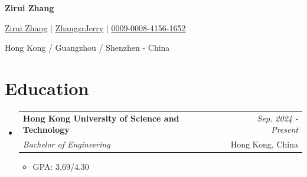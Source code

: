 \documentclass[a4paper,11pt]{article}
\makeatletter
\newcommand{\resumeSubheading}[4]{
\vspace{0.5mm}\item
    \begin{tabular*}{0.98\textwidth}[t]{l@{\extracolsep{\fill}}r}
        \textbf{#1} & \textit{\footnotesize{#4}} \\
        \textit{\footnotesize{#3}} &  \footnotesize{#2}\\
    \end{tabular*}
    \vspace{-2.4mm}
}
\newcommand{\resumeSubHeadingListStart}{\begin{itemize}[leftmargin=*,labelsep=1mm]}
\newcommand{\resumeItemListStart}{\begin{itemize}[leftmargin=*,labelsep=1mm,itemsep=0.5mm]}
\newcommand{\resumeSubHeadingListEnd}{\end{itemize}\vspace{2mm}}
\newcommand{\resumeItemListEnd}{\end{itemize}\vspace{-2mm}}
\newcommand{\socialicon}[1]{\raisebox{-0.05em}{\resizebox{!}{1em}{#1}}}
\newcommand{\headerfontiii}{\fontfamily{ppl}\selectfont} %
\makeatother
\begin{document}
\headerfontiii

\begin{center}
    {\Huge\textbf{Zirui Zhang}}
\end{center}
\vspace{-6mm}

\begin{center}
    \small{
    \socialicon{\faLinkedin} \href{https://www.linkedin.com/in/zirui-zhang-924958319/}{Zirui Zhang} | 
    \socialicon{\faGithub} \href{https://github.com/zhangzrjerry}{ZhangzrJerry} | 
    \socialicon{\faOrcid} \href{https://orcid.org/0009-0008-4156-1652}{0009-0008-4156-1652}
    }
\end{center}
\vspace{-6mm}
\begin{center}
    \small{Hong Kong / Guangzhou / Shenzhen - China}
\end{center}

\vspace{-4mm}

\section{\textbf{Education}}
\vspace{-0.4mm}
\resumeSubHeadingListStart

\resumeSubheading
{Hong Kong University of Science and Technology}{Hong Kong, China}
{Bachelor of Engineering}{Sep. 2024 - Present}
\resumeItemListStart
\item GPA: 3.69/4.30
\resumeItemListEnd

\resumeSubHeadingListEnd
\vspace{-6mm}
\end{document}
